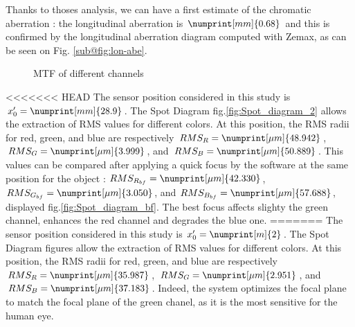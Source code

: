 \documentclass[10pt,letterpaper]{article}
\begin{document}
Thanks to thoses analysis, we can have a first estimate of the chromatic aberration : the longitudinal aberration is $\numprint[mm]{0.68}$ and this is confirmed by the longitudinal aberration diagram computed with Zemax, as can be seen on Fig. \ref{sub@fig:lon-abe}.
\begin{figure}[h]
    \centering
	\caption{MTF of different channels}
    \label{fig:fft-colors}
\end{figure}

<<<<<<< HEAD
The sensor position considered in this study is $x'_0 = \numprint[mm]{28.9}$. The Spot Diagram fig.\ref{fig:Spot_diagram_2} allows the extraction of RMS values for different colors. At this position, the RMS radii for red, green, and blue are respectively $RMS_R = \numprint[\mu m]{48.942}$, $RMS_G = \numprint[\mu m]{3.999}$, and $RMS_B = \numprint[\mu m]{50.889}$. This values can be compared after applying a quick focus by the software at the same position for the object : $RMS_{R_{bf}} = \numprint[\mu m]{42.330}$, $RMS_{G_{bf}} = \numprint[\mu m]{3.050}$, and $RMS_{B_{bf}} = \numprint[\mu m]{57.688}$, displayed fig.\ref{fig:Spot_diagram_bf}. The best focus affects slighty the green channel, enhances the red channel and degrades the blue one.
=======
The sensor position considered in this study is $x'_0 = \numprint[m]{2}$. The Spot Diagram figures allow the extraction of RMS values for different colors. At this position, the RMS radii for red, green, and blue are respectively $RMS_R = \numprint[\mu m]{35.987}$, $RMS_G = \numprint[\mu m]{2.951}$, and $RMS_B = \numprint[\mu m]{37.183}$. Indeed, the system optimizes the focal plane to match the focal plane of the green chanel, as it is the most sensitive for the human eye.
\end{document}
